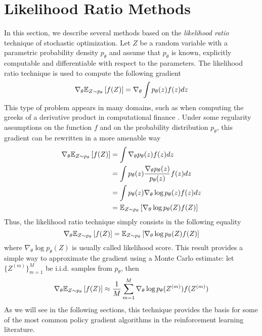 \section{Likelihood Ratio Methods}
In this section, we describe several methods based on the \emph{likelihood ratio} technique of stochastic optimization. Let $Z$ be a random variable with a parametric probability density $p_\theta$ and assume that $p_\theta$ is known, explicitly computable and differentiable with respect to the parameters. The likelihood ratio technique is used to compute the following gradient
\begin{equation*}
	\nabla_\theta \E[Z \sim p_\theta]{f(Z)} = \nabla_\theta \int p_\theta(z) f(z) dz
\end{equation*}
This type of problem appears in many domains, such as when computing the greeks of a  derivative product in computational finance \cite{pages2016introduction}. Under some regularity assumptions on the function $f$ and on the probability distribution $p_\theta$, this gradient can be rewritten in a more amenable way
\begin{equation*}
	\begin{split}
		\nabla_\theta \E[Z \sim p_\theta]{f(Z)} &= \int \nabla_\theta p_\theta(z) f(z) dz\\
		&= \int p_\theta(z) \frac{\nabla_\theta p_\theta(z)}{p_\theta(z)} f(z) dz\\
		&= \int p_\theta(z) \nabla_\theta \log p_\theta(z) f(z) dz\\
		&= \E[Z\sim p_\theta]{\nabla_\theta \log p_\theta(Z) f(Z)}
	\end{split}
\end{equation*}
Thus, the likelihood ratio technique simply consists in the following equality
\begin{equation}
	\nabla_\theta \E[Z \sim p_\theta]{f(Z)} = \E[Z\sim p_\theta]{\nabla_\theta \log p_\theta(Z) f(Z)}
\end{equation}
where $\nabla_\theta \log p_\theta(Z)$ is usually called likelihood score. This result provides a simple way to approximate the gradient using a Monte Carlo estimate: let $\{Z^{(m)}\}_{m=1}^M$ be i.i.d. samples from $p_\theta$, then 
\begin{equation}
	\nabla_\theta \E[Z \sim p_\theta]{f(Z)} \approx \frac{1}{M} \sum_{m=1}^M \nabla_\theta \log p_\theta(Z^{(m)}) f(Z^{(m)})	
\end{equation}
As we will see in the following sections, this technique provides the basis for some of the most common policy gradient algorithms in the reinforcement learning literature. 

